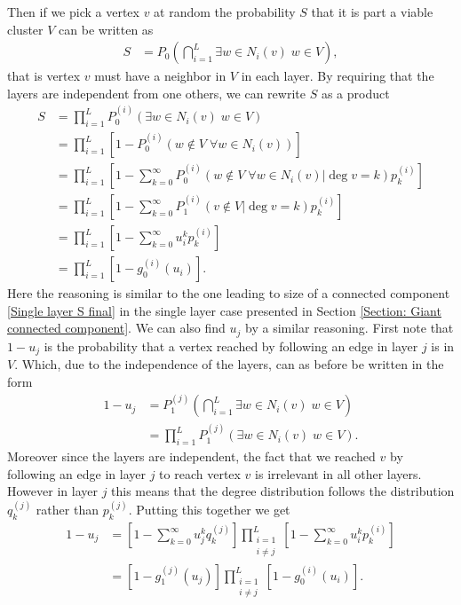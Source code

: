 \documentclass[
11pt, %
english, %
singlespacing, %
nolistspacing, %
liststotoc, %
headsepline, %
]{MastersDoctoralThesis} %
\begin{document}
Then if we pick a vertex $v$ at random the probability $S$ that it is part a viable cluster $V$ can be written as
\begin{align}
	S &= P_0\left(\bigcap_{i = 1}^{L} \exists w \in N_i(v) \; w \in V \right),
\end{align}
that is vertex $v$ must have a neighbor in $V$ in each layer. By requiring that the layers are independent from one others, we can rewrite $S$ as a product
\begin{align}
	S &= \prod_{i = 1}^{L}  P_0^{(i)}\left(\exists w \in N_i(v) \; w \in V\right) \\
		&=\prod_{i = 1}^{L}  \left[1 - P_0^{(i)}\left(w \notin V \; \forall w \in N_i(v)\right) \right] \\
		&=\prod_{i = 1}^{L}  \left[1 - \sum_{k = 0}^{\infty} P_0^{(i)}\left(w \notin V \; \forall w \in N_i(v) | \deg{v} = k \right) p^{(i)}_k \right] \\
		&=\prod_{i = 1}^{L}  \left[1 - \sum_{k = 0}^{\infty} P_1^{(i)}\left(v \notin V | \deg{v} = k \right) p^{(i)}_k \right] \\
		&=\prod_{i = 1}^{L}  \left[1 - \sum_{k = 0}^{\infty} u_i^k p^{(i)}_k \right] \\
		&=\prod_{i = 1}^{L}  \left[1 - g_0^{(i)}(u_i) \right].\label{Multiplex GCC size final}
\end{align}
Here the reasoning is similar to the one leading to size of a connected component \eqref{Single layer S final} in the single layer case presented in Section \ref{Section: Giant connected component}. We can also find $u_j$ by a similar reasoning. First note that $1 - u_j$ is the probability that a vertex reached by following an edge in layer $j$ is in $V$. Which, due to the independence of the layers, can as before be written in the form
\begin{align}
	1 - u_j &= P_1^{(j)}\left(\bigcap_{i = 1}^{L} \exists w \in N_i(v) \; w \in V\right)\\
	&= \prod_{i = 1}^{L}  P_1^{(j)}\left(\exists w \in N_i(v) \; w \in V \right).
\end{align}
Moreover since the layers are independent, the fact that we reached $v$ by following an edge in layer $j$ to reach vertex $v$ is irrelevant in all other layers. However in layer $j$ this means that the degree distribution follows the distribution $q_k^{(j)}$ rather than $p_k^{(j)}$. Putting this together we get
\begin{align}
	1 - u_j &= \left[1 - \sum_{k = 0}^{\infty} u_j^k q_k^{(j)} \right] \prod_{\substack{i = 1 \\ i \neq j}}^{L}  \left[1 - \sum_{k = 0}^{\infty} u_i^k p^{(i)}_k \right] \\
	&= \left[1 - g_1^{(j)}(u_j) \right] \prod_{\substack{i = 1 \\ i \neq j}}^{L}  \left[1 - g_0^{(i)}(u_i) \right]. \label{Multiplex u final}
\end{align}
\end{document}
